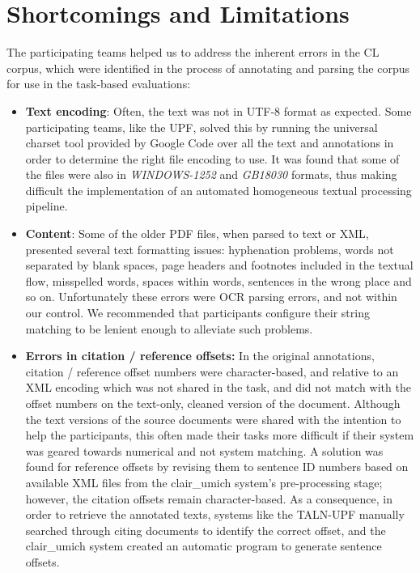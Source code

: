 \documentclass[11pt]{article}
\begin{document}
\section{Shortcomings and Limitations}
\label{sec:limitations}
The participating teams helped us to address the inherent errors in the CL corpus, which were identified in the process of annotating and parsing the corpus for use in the task-based evaluations:
\begin{itemize}
\item \textbf{Text encoding}: Often, the text was not in UTF-8 format as expected. Some participating teams, like the UPF, solved this by running the universal charset tool provided by Google Code over all the text and annotations in order to determine the right file encoding to use. It was found that some of the files were also in \textit{WINDOWS-1252} and \textit{GB18030} formats, thus making difficult the implementation of an automated homogeneous textual processing pipeline.
\vspace{-.3cm}
\item \textbf{Content}: Some of the older PDF files, when parsed to text or XML, presented several text formatting issues: hyphenation problems, words not separated by blank spaces, page headers and footnotes included in the textual flow, misspelled words, spaces within words, sentences in the wrong place and so on. Unfortunately these errors were OCR parsing errors, and not within our control. We recommended that  participants configure their string matching to be lenient enough to alleviate such problems.
\vspace{-.3cm}
\item \textbf{Errors in citation / reference offsets:} In the original annotations, citation / reference offset numbers were character-based, and relative to an XML encoding which was not shared in the task, and did not match with the offset numbers on the text-only, cleaned version of the document. Although the text versions of the source documents were shared with the intention to help the participants, this often made their tasks more difficult if their system was geared towards numerical and not system matching. A solution was found for reference offsets by revising them to sentence ID numbers based on available XML files from the clair\_umich system's pre-processing stage; however, the citation offsets remain character-based. As a consequence, in order to retrieve the annotated texts, systems like the TALN-UPF manually searched through citing documents to identify the correct offset, and the clair\_umich system created an automatic program to generate sentence offsets. 

\end{itemize}
\end{document}
